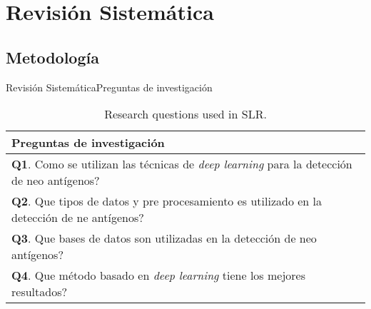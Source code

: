 \documentclass[10pt]{beamer}
\newcommand{\1}{
	\setbeamertemplate{background}{
		\texttt{[image: img/1]}
		\tikz[overlay] \fill[fill opacity=0.75,fill=white] (0,0) rectangle (-\paperwidth,\paperheight);
	}
}
\begin{document}
\section{Revisión Sistemática}


\subsection{Metodología}


\begin{frame}{Revisión Sistemática}{Preguntas de investigación}
	
	\begin{table}[h]
		\begin{center}
			\caption{Research questions used in SLR.}
			\label{tab:questions}
			\setlength{\tabcolsep}{0.5em} %
			{\renewcommand{\arraystretch}{1.4}%
				\begin{tabular}{p{8.5cm}}
					\textbf{Preguntas de investigación} \\ \hline
					\textbf{Q1}. Como se utilizan las técnicas de \textit{deep learning} para la detección de neo antígenos?\\
					\textbf{Q2}. Que tipos de datos y pre procesamiento es utilizado en la detección de ne antígenos?\\
					\textbf{Q3}. Que bases de datos son utilizadas en la detección de neo antígenos?\\
					\textbf{Q4}. Que método basado en \textit{deep learning} tiene los mejores resultados?   \\		
				\end{tabular}
			}
		\end{center}
	\end{table}

\end{frame}
\end{document}
